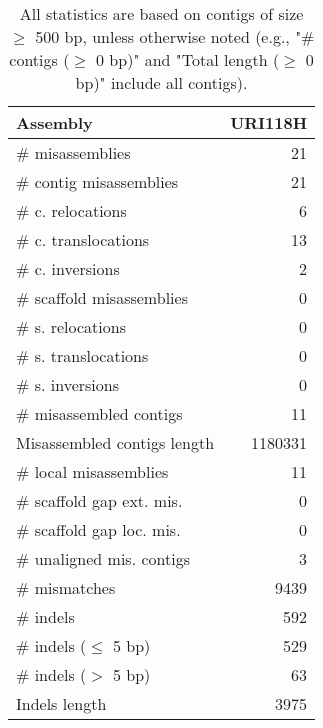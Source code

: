 \documentclass[12pt,a4paper]{article}
\begin{document}
\begin{table}[ht]
\begin{center}
\caption{All statistics are based on contigs of size $\geq$ 500 bp, unless otherwise noted (e.g., "\# contigs ($\geq$ 0 bp)" and "Total length ($\geq$ 0 bp)" include all contigs).}
\begin{tabular}{|l*{1}{|r}|}
\hline
Assembly & URI118H \\ \hline
\# misassemblies & 21 \\ \hline
\hspace{2mm}\# contig misassemblies & 21 \\ \hline
\hspace{5mm}\# c. relocations & 6 \\ \hline
\hspace{5mm}\# c. translocations & 13 \\ \hline
\hspace{5mm}\# c. inversions & 2 \\ \hline
\hspace{2mm}\# scaffold misassemblies & 0 \\ \hline
\hspace{5mm}\# s. relocations & 0 \\ \hline
\hspace{5mm}\# s. translocations & 0 \\ \hline
\hspace{5mm}\# s. inversions & 0 \\ \hline
\# misassembled contigs & 11 \\ \hline
Misassembled contigs length & 1180331 \\ \hline
\# local misassemblies & 11 \\ \hline
\# scaffold gap ext. mis. & 0 \\ \hline
\# scaffold gap loc. mis. & 0 \\ \hline
\# unaligned mis. contigs & 3 \\ \hline
\# mismatches & 9439 \\ \hline
\# indels & 592 \\ \hline
\hspace{5mm}\# indels ($\leq$ 5 bp) & 529 \\ \hline
\hspace{5mm}\# indels ($>$ 5 bp) & 63 \\ \hline
Indels length & 3975 \\ \hline
\end{tabular}
\end{center}
\end{table}
\end{document}
